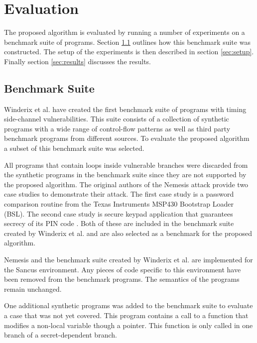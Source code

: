 
\chapter{Evaluation}
\label{cha:evaluation}
The proposed algorithm is evaluated by running a number of experiments on a benchmark suite of programs. 
Section \ref{sec:benchmark-suite} outlines how this benchmark suite was constructed. 
The setup of the experiments is then described in section \ref{sec:setup}. Finally section \ref{sec:results} discusses the results. 

\section{Benchmark Suite}
\label{sec:benchmark-suite}
Winderix et al. \cite{WinderixHans} have created the first benchmark suite of programs with timing side-channel vulnerabilities. This suite consists of a 
collection of synthetic programs with a wide range of control-flow patterns as well as third party benchmark programs from different sources. 
To evaluate the proposed algorithm a subset of this benchmark suite was selected. 

All programs that contain loops inside vulnerable branches were discarded from the synthetic programs in the benchmark suite
since they are not supported by the proposed algorithm. 
The original authors of the Nemesis attack provide two case studies to demonstrate their attack. 
The first case study is a password comparison routine from the Texas Instruments MSP430 Bootstrap Loader (BSL). 
The second case study is secure keypad application that guarantees secrecy of its PIN code \cite{Nemesis}.
Both of these are included in the benchmark suite created by Winderix et al.\cite{WinderixHans}  and are also selected as a benchmark for the proposed algorithm. 

Nemesis and the benchmark suite created by Winderix et al. \cite{WinderixHans} are implemented for the Sancus environment. Any pieces of code specific to this
environment have been removed from the benchmark programs. The semantics of the programs remain unchanged. 

One additional synthetic programs was added to the benchmark suite to evaluate a case that was not yet covered. This program contains a call to a function that 
modifies a non-local variable though a pointer. This function is only called in one branch of a secret-dependent branch. 

